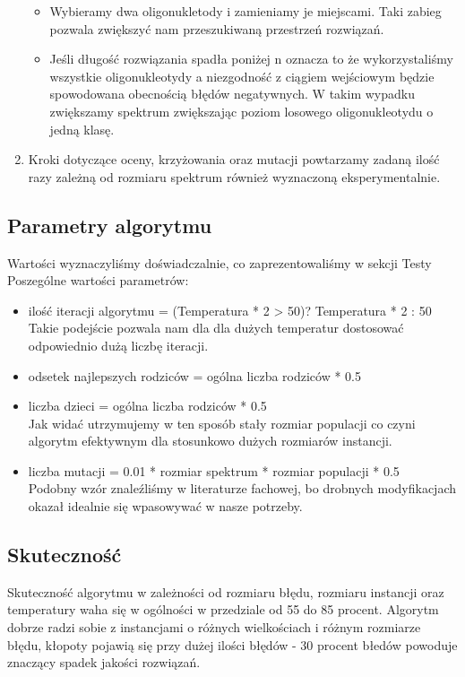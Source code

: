\documentclass{article}
\begin{document}
\begin{enumerate}
\begin{itemize}
\item Wybieramy dwa oligonukletody i zamieniamy je miejscami. Taki zabieg pozwala zwiększyć nam przeszukiwaną przestrzeń rozwiązań.
\item Jeśli długość rozwiązania spadła poniżej n oznacza to że wykorzystaliśmy wszystkie oligonukleotydy a niezgodność z ciągiem wejściowym będzie spowodowana obecnością błędów negatywnych. W takim wypadku zwiększamy spektrum zwiększając poziom losowego oligonukleotydu o jedną klasę.
\end{itemize}	
\item Kroki dotyczące oceny, krzyżowania oraz mutacji powtarzamy zadaną ilość razy zależną od rozmiaru spektrum również wyznaczoną eksperymentalnie.
\end{enumerate}
\subsection{Parametry algorytmu}
Wartości wyznaczyliśmy doświadczalnie, co zaprezentowaliśmy w sekcji Testy
Poszególne wartości parametrów:
\begin{itemize}
\item ilość iteracji algorytmu = (Temperatura * 2 > 50)? Temperatura * 2 : 50
\\Takie podejście pozwala nam dla dla dużych temperatur dostosować odpowiednio dużą liczbę iteracji.
\item odsetek najlepszych rodziców = ogólna liczba rodziców * 0.5
\item liczba dzieci = ogólna liczba rodziców * 0.5
\\Jak widać utrzymujemy w ten sposób stały rozmiar populacji co czyni algorytm efektywnym dla stosunkowo dużych rozmiarów instancji.
\item liczba mutacji = 0.01 * rozmiar spektrum * rozmiar populacji * 0.5
\\Podobny wzór znaleźliśmy w literaturze fachowej, bo drobnych modyfikacjach okazał idealnie się wpasowywać w nasze potrzeby.
\end{itemize}
\subsection{Skuteczność}
Skuteczność algorytmu w zależności od rozmiaru błędu, rozmiaru instancji oraz temperatury waha się w ogólności w przedziale od 55 do 85 procent. Algorytm dobrze radzi sobie z instancjami o różnych wielkościach i różnym rozmiarze błędu, kłopoty pojawią się przy dużej ilości błędów - 30 procent błedów powoduje znaczący spadek jakości rozwiązań.
\end{document}
